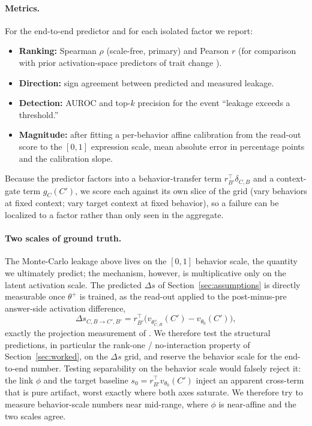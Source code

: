 \documentclass[11pt]{article}
\theoremstyle{definition}
\theoremstyle{definition}
\theoremstyle{assumptionstyle}
\newcounter{prediction}
\begin{document}
\paragraph{Metrics.}
For the end-to-end predictor and for each isolated factor we report:
\begin{itemize}
  \item \textbf{Ranking:} Spearman $\rho$ (scale-free, primary) and Pearson $r$
        (for comparison with prior activation-space predictors of trait change
        \cite{chen2025}).
  \item \textbf{Direction:} sign agreement between predicted and measured leakage.
  \item \textbf{Detection:} AUROC and top-$k$ precision for the event ``leakage
        exceeds a threshold.''
  \item \textbf{Magnitude:} after fitting a per-behavior affine calibration from the
        read-out score to the $[0,1]$ expression scale, mean absolute error in
        percentage points and the calibration slope.
\end{itemize}
Because the predictor factors into a behavior-transfer term $r_{B'}^\top\delta_{C,B}$ and a
context-gate term $g_{C}(C')$, we score each against its own slice of the grid
(vary behaviors at fixed context; vary target context at fixed behavior), so a
failure can be localized to a factor rather than only seen in the aggregate.
\paragraph{Two scales of ground truth.} The Monte-Carlo leakage above lives on
the $[0,1]$ behavior scale, the quantity we ultimately predict; the mechanism,
however, is multiplicative only on the latent activation scale. The predicted
$\Delta s$ of Section~\ref{sec:assumptions} is directly measurable once
$\theta^+$ is trained, as the read-out applied to the post-minus-pre answer-side
activation difference,
\[
\Delta s_{C,B\to C',B'}
=
r_{B'}^\top\big(v_{\theta^+_{C,B}}(C')-v_{\theta_0}(C')\big),
\]
exactly the projection measurement of \cite{chen2025}. We therefore test the
structural predictions, in particular the rank-one / no-interaction property of
Section~\ref{sec:worked}, on the $\Delta s$ grid, and reserve the behavior scale
for the end-to-end number. Testing separability on the behavior scale would
falsely reject it: the link $\phi$ and the target baseline
$s_0=r_{B'}^\top v_{\theta_0}(C')$ inject an apparent cross-term that is pure
artifact, worst exactly where both axes saturate. We therefore try to measure behavior-scale numbers near mid-range, where $\phi$ is near-affine and the two
scales agree.
\end{document}
